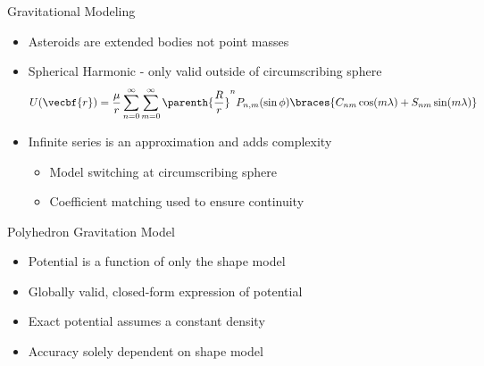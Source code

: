 \documentclass[11pt,professionalfonts]{beamer}
\begin{document}
\begin{frame}{Gravitational Modeling} %

\begin{itemize}
  \item Asteroids are extended bodies not point masses
  \pause
  \item Spherical Harmonic - only valid outside of circumscribing sphere
    {
    \small
    \begin{align*}
      U(\vecbf{r} ) = \frac{\mu}{r} \sum_{n=0}^\infty \sum_{m=0}^\infty \parenth{\frac{R}{r}}^nP_{n,m}(\sin \phi) \braces{ C_{nm} \cos(m \lambda) + S_{nm} \sin(m \lambda)} 
    \end{align*}
    }
    \pause
  \item Infinite series is an approximation and adds complexity
    \begin{itemize}
        \item Model switching at circumscribing sphere
        \item Coefficient matching used to ensure continuity 
    \end{itemize}
\end{itemize}


\end{frame}   %


\begin{frame}{Polyhedron Gravitation Model}

\begin{itemize}
    \item Potential is a function of only the shape model
    \item Globally valid, closed-form expression of potential
    \item Exact potential assumes a constant density 
    \item Accuracy solely dependent on shape model
\end{itemize}

\end{frame}
\end{document}
